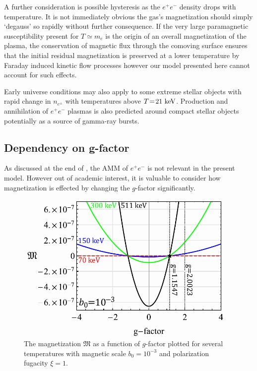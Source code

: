 A further consideration is possible hysteresis as the $e^{+}e^{-}$ density drops with temperature. It is not immediately obvious the gas's magnetization should simply `degauss' so rapidly without further consequence. If the very large paramagnetic susceptibility present for $T\simeq m_{e}$ is the origin of an overall magnetization of the plasma, the conservation of magnetic flux through the comoving surface ensures that the initial residual magnetization is preserved at a lower temperature by Faraday induced kinetic flow processes however our model presented here cannot account for such effects.

Early universe conditions may also apply to some extreme stellar objects with rapid change in $n_{e^{\pm}}$ with temperatures above $T\!=\!21\text{ keV}$. Production and annihilation of $e^{+}e^{-}$ plasmas is also predicted around compact stellar objects~\cite{Ruffini:2009hg,Ruffini:2012it} potentially as a source of gamma-ray bursts.

\subsection{Dependency on g-factor}
\label{sec:gfac}

\noindent As discussed at the end of , the AMM of $e^{+}e^{-}$ is not relevant in the present model. However out of academic interest, it is valuable to consider how magnetization is effected by changing the $g$-factor significantly.

\begin{figure}[ht]
 \centering
 \includegraphics[width=0.95\textwidth]{plots/chap04cosmo/thesis_gfac.pdf}
 \caption{The magnetization $\mathfrak M$ as a function of $g$-factor plotted for several temperatures with magnetic scale $b_{0}=10^{-3}$ and polarization fugacity $\xi=1$.}
 \label{fig:gfac} 
\end{figure}

